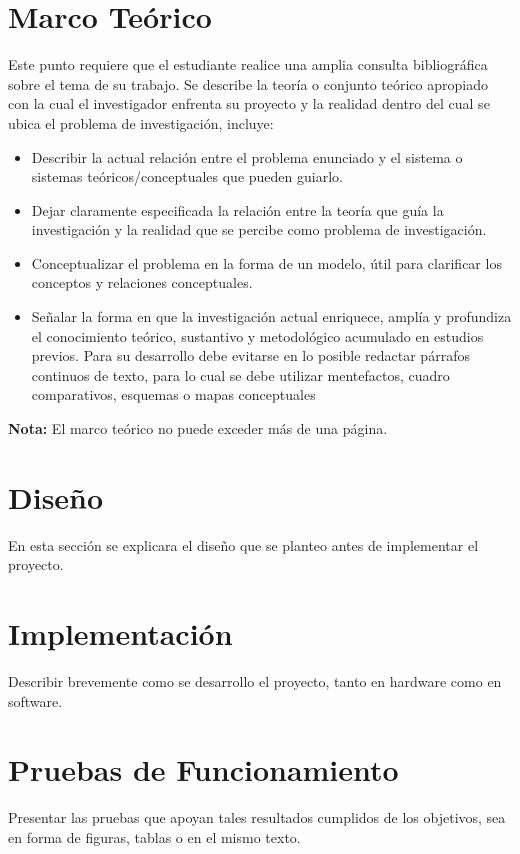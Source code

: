 \documentclass[runningheads]{llncs}
\begin{document}
\section{Marco Teórico}
Este punto requiere que el estudiante realice una amplia consulta bibliográfica sobre el tema de su trabajo.
Se describe la teoría o conjunto teórico apropiado con la cual el investigador enfrenta su proyecto y la realidad dentro del cual se ubica el problema de investigación, incluye:
\begin{itemize}
    \item Describir la actual relación entre el problema enunciado y el sistema o sistemas teóricos/conceptuales que pueden guiarlo.
    \item Dejar claramente especificada la relación entre la teoría que guía la investigación y la realidad que se percibe como problema de investigación.
    \item Conceptualizar el problema en la forma de un modelo, útil para clarificar los conceptos y relaciones conceptuales.
    \item Señalar la forma en que la investigación actual enriquece, amplía y profundiza el conocimiento teórico, sustantivo y metodológico acumulado en estudios previos. Para su desarrollo debe evitarse en lo posible redactar párrafos continuos de texto, para lo cual se debe utilizar mentefactos, cuadro comparativos, esquemas o mapas conceptuales
\end{itemize}
\textbf{Nota: }El marco teórico no puede exceder más de una página.
\section{Diseño}
En esta sección se explicara el diseño que se planteo antes de implementar el proyecto. 
\section{Implementación}
Describir brevemente como se desarrollo el proyecto, tanto en hardware como en software.
\section{Pruebas de Funcionamiento}
Presentar las pruebas que apoyan tales resultados cumplidos de los objetivos, sea en forma de figuras, tablas o en el mismo texto. 
\end{document}
